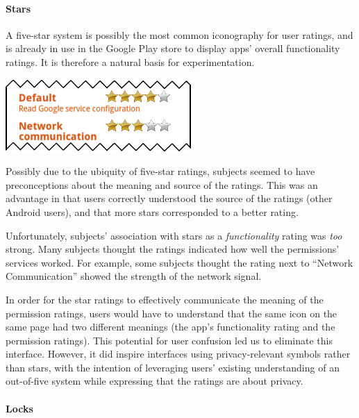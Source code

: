 \documentclass[11pt]{article}
\begin{document}
\paragraph{Stars}
\label{s-sec-stars}

A five-star system is possibly the most common iconography for user ratings,
and is already in use in the Google Play store to display apps' overall 
functionality ratings. It is therefore a natural basis for experimentation.

\label{ss-sec-stars-r1}
\begin{center}
\includegraphics[width=.5\linewidth]{candidate-img/stars/starsR1.png}
\end{center}

Possibly due to the ubiquity of five-star ratings, 
subjects seemed to have preconceptions 
about the meaning and source of the ratings. This was an advantage 
in that users correctly understood the source of
the ratings (other Android users), and that more stars corresponded to a 
better rating.

Unfortunately, subjects' association with stars as a \emph{functionality} rating 
was \emph{too} strong. Many subjects thought the ratings indicated how well 
the permissions' services worked. For example, some subjects thought the rating next 
to ``Network Communication'' showed the strength of the network signal. 

In order for the star ratings to effectively communicate the meaning of the permission 
ratings, users would have to understand that the same icon
on the same page had two different meanings (the app's functionality
rating and the permission ratings). This potential for user confusion led
us to eliminate this interface.
However, it did inspire interfaces using privacy-relevant symbols rather than stars, with 
the intention of
leveraging users' existing understanding of an out-of-five system while
expressing that the ratings are about privacy.


\paragraph{Locks}
\label{s-sec-locks}
\end{document}
